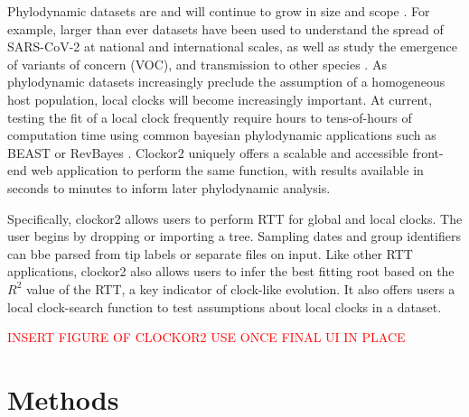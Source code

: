 \documentclass{article}
\begin{document}
Phylodynamic datasets are and will continue to grow in size and scope \cite{featherstone2022epidemiological}. For example, larger than ever datasets have been used to understand the spread of SARS-CoV-2 at national and international scales, as well as study the emergence of variants of concern (VOC), and transmission to other species \citep{du_plessis_establishment_2021,hill_origins_2022,nadeau_swiss_2023,porter2023evolutionary}. As phylodynamic datasets increasingly preclude the assumption of a homogeneous host population, local clocks will become increasingly important. At current, testing the fit of a local clock frequently require hours to tens-of-hours of computation time using common bayesian phylodynamic applications such as BEAST or RevBayes \citep{bouckaert_beast_2019, suchard_bayesian_2018, hoehna_2016_revbayes}. Clockor2 uniquely offers a scalable and accessible front-end web application to perform the same function, with results available in seconds to minutes to inform later phylodynamic analysis.

Specifically, clockor2 allows users to perform RTT for global and local clocks. The user begins by dropping or importing a tree. Sampling dates and group identifiers can bbe parsed from tip labels or separate files on input. Like other RTT applications, clockor2 also allows users to infer the best fitting root based on the $R^2$ value of the RTT, a key indicator of clock-like evolution. It also offers users a local clock-search function to test assumptions about local clocks in a dataset. 

\textcolor{red}{INSERT FIGURE OF CLOCKOR2 USE ONCE FINAL UI IN PLACE}

\section*{Methods}
\end{document}
